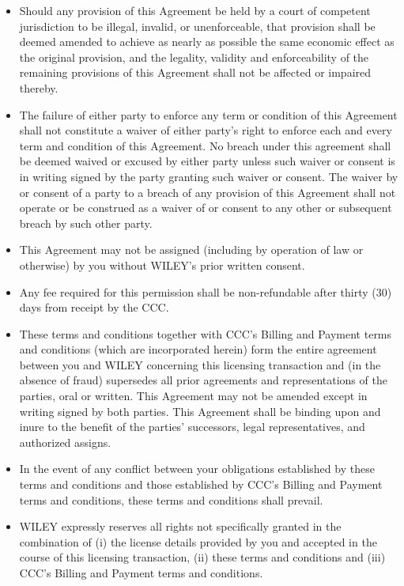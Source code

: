 \begin{itemize}
\item Should any provision of this Agreement be held by a court of competent jurisdiction to be illegal, invalid, or unenforceable, that provision shall be deemed amended to achieve as nearly as possible the same economic effect as the original provision, and the legality, validity and enforceability of the remaining provisions of this Agreement shall not be affected or impaired thereby.

\item The failure of either party to enforce any term or condition of this Agreement shall not constitute a waiver of either party's right to enforce each and every term and condition of this Agreement. No breach under this agreement shall be deemed waived or excused by either party unless such waiver or consent is in writing signed by the party granting such waiver or consent. The waiver by or consent of a party to a breach of any provision of this Agreement shall not operate or be construed as a waiver of or consent to any other or subsequent breach by such other party.

\item This Agreement may not be assigned (including by operation of law or otherwise) by you without WILEY's prior written consent.

\item Any fee required for this permission shall be non-refundable after thirty (30) days from receipt by the CCC.

\item These terms and conditions together with CCC's Billing and Payment terms and conditions (which are incorporated herein) form the entire agreement between you and WILEY concerning this licensing transaction and (in the absence of fraud) supersedes all prior agreements and representations of the parties, oral or written. This Agreement may not be amended except in writing signed by both parties. This Agreement shall be binding upon and inure to the benefit of the parties' successors, legal representatives, and authorized assigns.

\item In the event of any conflict between your obligations established by these terms and conditions and those established by CCC's Billing and Payment terms and conditions, these terms and conditions shall prevail.

\item WILEY expressly reserves all rights not specifically granted in the combination of (i) the license details provided by you and accepted in the course of this licensing transaction, (ii) these terms and conditions and (iii) CCC's Billing and Payment terms and conditions.


\end{itemize}
